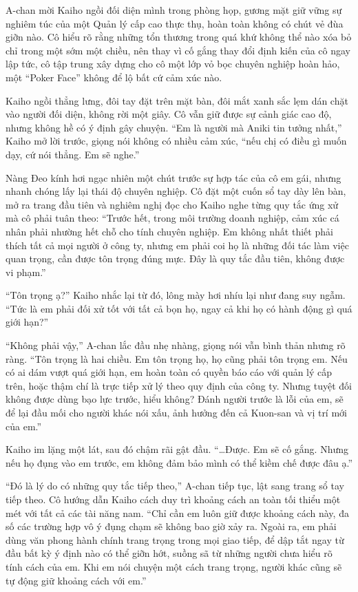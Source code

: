 \documentclass[../main.tex]{subfiles}
\begin{document}
A-chan mời Kaiho ngồi đối diện mình trong phòng họp, gương mặt giữ vững sự nghiêm túc của một Quản lý cấp cao thực thụ, hoàn toàn không có chút vẻ đùa giỡn nào. Cô hiểu rõ rằng những tổn thương trong quá khứ không thể nào xóa bỏ chỉ trong một sớm một chiều, nên thay vì cố gắng thay đổi định kiến của cô ngay lập tức, cô tập trung xây dựng cho cô một lớp vỏ bọc chuyên nghiệp hoàn hảo, một ``Poker Face'' không để lộ bất cứ cảm xúc nào.

Kaiho ngồi thẳng lưng, đôi tay đặt trên mặt bàn, đôi mắt xanh sắc lẹm dán chặt vào người đối diện, không rời một giây. Cô vẫn giữ được sự cảnh giác cao độ, nhưng không hề có ý định gây chuyện. ``Em là người mà Aniki tin tưởng nhất,'' Kaiho mở lời trước, giọng nói không có nhiều cảm xúc, ``nếu chị có điều gì muốn dạy, cứ nói thẳng. Em sẽ nghe.''

Nàng Đeo kính hơi ngạc nhiên một chút trước sự hợp tác của cô em gái, nhưng nhanh chóng lấy lại thái độ chuyên nghiệp. Cô đặt một cuốn sổ tay dày lên bàn, mở ra trang đầu tiên và nghiêm nghị đọc cho Kaiho nghe từng quy tắc ứng xử mà cô phải tuân theo: ``Trước hết, trong môi trường doanh nghiệp, cảm xúc cá nhân phải nhường hết chỗ cho tính chuyên nghiệp. Em không nhất thiết phải thích tất cả mọi người ở công ty, nhưng em phải coi họ là những đối tác làm việc quan trọng, cần được tôn trọng đúng mực. Đây là quy tắc đầu tiên, không được vi phạm.''

``Tôn trọng ạ?'' Kaiho nhắc lại từ đó, lông mày hơi nhíu lại như đang suy ngẫm. ``Tức là em phải đối xử tốt với tất cả bọn họ, ngay cả khi họ có hành động gì quá giới hạn?''

``Không phải vậy,'' A-chan lắc đầu nhẹ nhàng, giọng nói vẫn bình thản nhưng rõ ràng. ``Tôn trọng là hai chiều. Em tôn trọng họ, họ cũng phải tôn trọng em. Nếu có ai dám vượt quá giới hạn, em hoàn toàn có quyền báo cáo với quản lý cấp trên, hoặc thậm chí là trực tiếp xử lý theo quy định của công ty. Nhưng tuyệt đối không được dùng bạo lực trước, hiểu không? Đánh người trước là lỗi của em, sẽ để lại đầu mối cho người khác nói xấu, ảnh hưởng đến cả Kuon-san và vị trí mới của em.''

Kaiho im lặng một lát, sau đó chậm rãi gật đầu. ``\dots Được. Em sẽ cố gắng. Nhưng nếu họ đụng vào em trước, em không đảm bảo mình có thể kiềm chế được đâu ạ.''

``Đó là lý do có những quy tắc tiếp theo,'' A-chan tiếp tục, lật sang trang sổ tay tiếp theo. Cô hướng dẫn Kaiho cách duy trì khoảng cách an toàn tối thiểu một mét với tất cả các tài năng nam. ``Chỉ cần em luôn giữ được khoảng cách này, đa số các trường hợp vô ý đụng chạm sẽ không bao giờ xảy ra. Ngoài ra, em phải dùng văn phong hành chính trang trọng trong mọi giao tiếp, để dập tắt ngay từ đầu bất kỳ ý định nào có thể giỡn hớt, suồng sã từ những người chưa hiểu rõ tính cách của em. Khi em nói chuyện một cách trang trọng, người khác cũng sẽ tự động giữ khoảng cách với em.''
\end{document}

